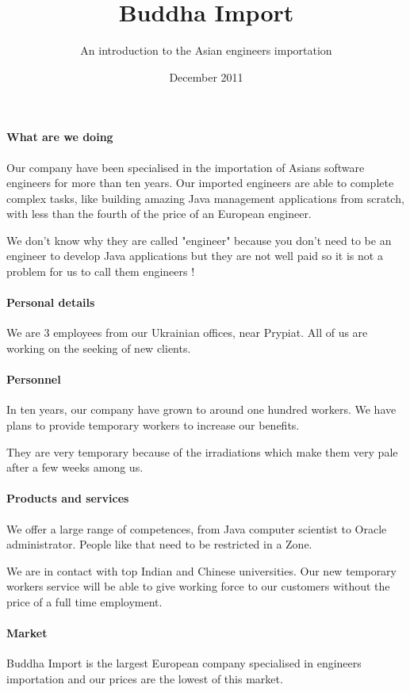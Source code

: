 \documentclass[a4paper,12pt]{article}
\title{Buddha Import}
\author{An introduction to the Asian engineers importation}
\date{December 2011}
\begin{document}
\maketitle 

\paragraph{What are we doing}
Our company have been specialised in the importation of Asians software
engineers for more than ten years. Our imported engineers are able to complete
complex tasks, like building amazing Java management applications from scratch,
with less than the fourth of the price of an European engineer.

We don't know why they are called "engineer" because you don't need to be an engineer to develop 
Java applications but they are not well paid so it is not a problem for us to call them engineers !


\paragraph{Personal details}
We are 3 employees from our Ukrainian offices, near Prypiat. All of us are
working on the seeking of new clients.


\paragraph{Personnel}
In ten years, our company have grown to around one hundred workers. We have
plans to provide temporary workers to increase our benefits.

They are very temporary because of the irradiations which make them very pale after a few weeks among us.

\paragraph{Products and services}
We offer a large range of competences, from Java computer scientist to Oracle
administrator.  People like that need to be restricted in a Zone.

We are in contact with top Indian and Chinese universities. Our
new temporary workers service will be able to give working force to our
customers without the price of a full time employment. 

\paragraph{Market}
Buddha Import is the largest European company specialised in engineers
importation and our prices are the lowest of this market.
\end{document}
